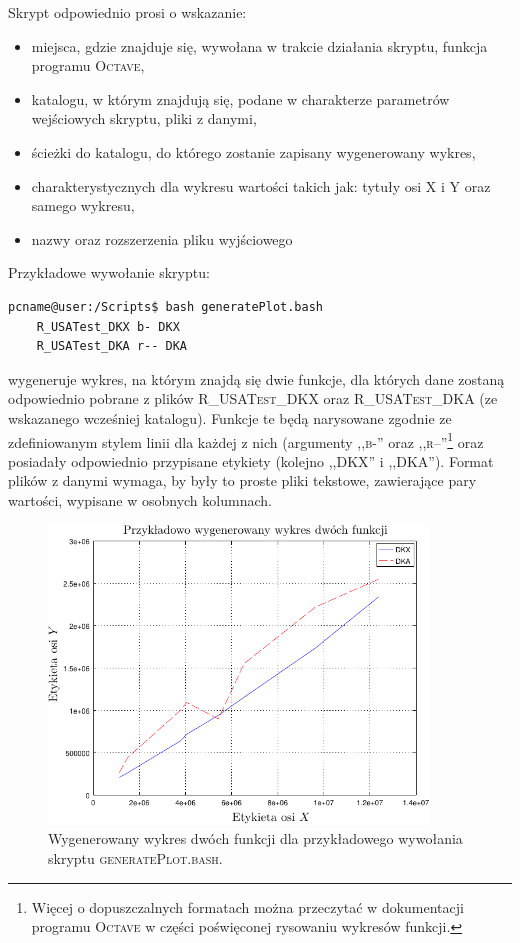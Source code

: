 Skrypt odpowiednio prosi o wskazanie:

\begin{itemize}
\item miejsca, gdzie znajduje się, wywołana w trakcie działania skryptu, funkcja programu \textsc{Octave},
\item katalogu, w którym znajdują się, podane w charakterze parametrów wejściowych skryptu, pliki z danymi,
\item ścieżki do katalogu, do którego zostanie zapisany wygenerowany wykres,
\item charakterystycznych dla wykresu wartości takich jak: tytuły osi X i Y oraz samego wykresu,
\item nazwy oraz rozszerzenia pliku wyjściowego
\end{itemize}

Przykładowe wywołanie skryptu:

\begin{lstlisting}[language=bash]
pcname@user:/Scripts$ bash generatePlot.bash
	R_USATest_DKX b- DKX 
	R_USATest_DKA r-- DKA
\end{lstlisting}

wygeneruje wykres, na którym znajdą się dwie funkcje, dla których dane zostaną odpowiednio pobrane z plików \textsc{R\_USATest\_DKX} oraz \textsc{R\_USATest\_DKA} (ze wskazanego wcześniej katalogu). Funkcje te będą narysowane zgodnie ze zdefiniowanym stylem linii dla każdej z nich (argumenty ,,\textsc{b-}'' oraz ,,\textsc{r--}''\footnote{Więcej o dopuszczalnych formatach można przeczytać w dokumentacji programu \textsc{Octave} w części poświęconej rysowaniu wykresów funkcji.} oraz posiadały odpowiednio przypisane etykiety (kolejno ,,\textsc{DKX}'' i ,,\textsc{DKA}''). Format plików z danymi wymaga, by były to proste pliki tekstowe, zawierające pary wartości, wypisane w osobnych kolumnach.

\begin{figure}[!htbp]
	\centering
	\includegraphics[width=0.9\textwidth]{Appendix_I/GENERATE-PLOT-bash/a_psfrag.pdf}
	\caption{Wygenerowany wykres dwóch funkcji dla przykładowego wywołania skryptu \textsc{generatePlot.bash}.}
\end{figure}

